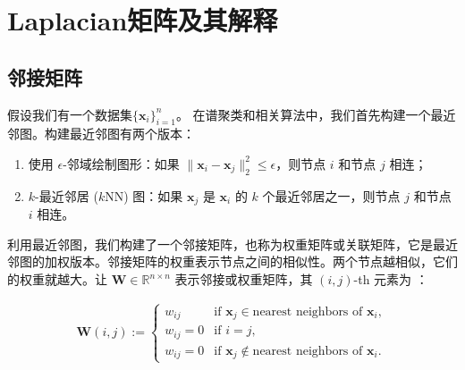 \documentclass[lang=cn,10pt]{gorgeousnbook}
\numberwithin{equation}{section}%
\numberwithin{figure}{section}%
\begin{document}
\begin{center}
\end{center}
\section{Laplacian矩阵及其解释}\label{section_interpretation_Laplacian}
\subsection{邻接矩阵}
假设我们有一个数据集$\{\boldsymbol{x}_i\}_{i=1}^n$。
在谱聚类和相关算法中，我们首先构建一个最近邻图。构建最近邻图有两个版本：

\begin{enumerate}
\item 使用 $\epsilon$-邻域绘制图形：如果 $\|\boldsymbol{x}_i - \boldsymbol{x}_j\|_2^2 \leq \epsilon$，则节点 $i$ 和节点 $j$ 相连；
\item $k$-最近邻居 ($k$NN) 图：如果 $\boldsymbol{x}_j$ 是 $\boldsymbol{x}_i$ 的 $k$ 个最近邻居之一，则节点 $j$ 和节点 $i$ 相连。
\end{enumerate}
利用最近邻图，我们构建了一个邻接矩阵，也称为权重矩阵或关联矩阵，它是最近邻图的加权版本。邻接矩阵的权重表示节点之间的相似性。两个节点越相似，它们的权重就越大。让 $\boldsymbol{W} \in \mathbb{R}^{n \times n}$ 表示邻接或权重矩阵，其 $(i,j)$-th 元素为 \cite{ng2001spectral}：

\begin{align}\label{equation_adjacency_matrix}
\boldsymbol{W}(i,j) := 
\left\{
    \begin{array}{ll}
        w_{ij} & \mbox{if } \boldsymbol{x}_j \in \text{nearest neighbors of } \boldsymbol{x}_i, \\
        w_{ij} = 0 & \mbox{if } i = j, \\
        w_{ij} = 0 & \mbox{if } \boldsymbol{x}_j \not\in \text{nearest neighbors of } \boldsymbol{x}_i.
    \end{array}
\right.
\end{align}
\end{document}
